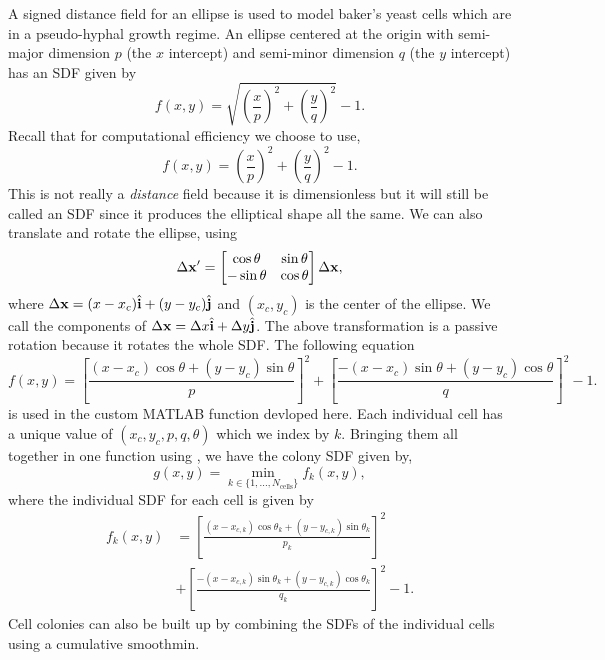 A signed distance field for an ellipse is used to model baker's yeast cells which
are in a pseudo-hyphal growth regime.
An ellipse centered at the origin with semi-major dimension $p$ (the $x$ intercept) and
semi-minor dimension $q$ (the $y$ intercept) has an SDF given by
\begin{equation*}
    f(x,y) = \sqrt{ \left( \frac{x}{p} \right)^2 + \left( \frac{y}{q} \right)^2 } - 1.
\end{equation*}
Recall that for computational efficiency we choose to use,
\begin{equation*}
    f(x,y) = \left( \frac{x}{p} \right)^2 + \left( \frac{y}{q} \right)^2  - 1.
\end{equation*}
This is not really a \textit{distance} field because it is 
dimensionless but it will still be called an SDF since it produces the 
elliptical shape all the same. We can also translate and rotate the ellipse, using
\begin{equation*} 
    \Delta \vb{x}' = 
    \begin{bmatrix}
        \cos{\theta} & \sin{\theta} \\
        -\sin{\theta} & \cos{\theta} 
    \end{bmatrix}
    \Delta \vb{x},
\end{equation*}
where $\Delta \vb{x} = (x-x_c) \hat{\vb{i}} + (y-y_c)\hat{\vb{j}} $ and $(x_c,y_c)$ is the
center of the ellipse. We call the components of $\Delta \vb{x} = \Delta x \hat{\vb{i}} +
\Delta y \hat{\vb{j}} $. The above transformation is a passive rotation because 
it rotates the whole SDF. The following equation
\begin{equation*}
    f(x,y) = \left[\frac{ (x-x_c)\cos{\theta} + (y-y_c) \sin{\theta}}{p} \right]^2 
        + \left[ \frac{-(x-x_c)\sin{\theta} +(y-y_c) \cos{\theta}}{q} \right]^2 - 1.
\end{equation*}
is used in the custom MATLAB function  devloped here. Each individual 
cell has a unique value of $(x_c,y_c,p,q,\theta)$ which we index by $k$. Bringing them all 
together in one function using , we have the colony SDF given by,
\begin{equation*}
    g(x,y) = \min_{k \in \{1, ..., N_{\textrm{cells}}\}} f_k(x,y),
\end{equation*}
where the individual SDF for each cell is given by 
\begin{equation*}
    \begin{split}
    f_k(x,y) &= \left[\frac{ (x-x_{c,k})\cos{\theta_k} + (y-y_{c,k}) \sin{\theta_k}}{p_k} \right]^2 \\ 
        &+ \left[ \frac{-(x-x_{c,k})\sin{\theta_k} +(y-y_{c,k}) \cos{\theta_k}}{q_k} \right]^2 - 1.
    \end{split}
\end{equation*}
Cell colonies can also be built up by combining the SDFs of the individual cells 
using a cumulative $\textrm{smoothmin}$.
\\

